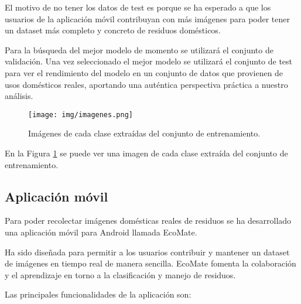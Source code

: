 \documentclass[10pt,a4paper,twocolumn,twoside]{article}
\begin{document}
El motivo de no tener los datos de test es porque se ha esperado a que los usuarios de la aplicación móvil
contribuyan con más imágenes para poder tener un dataset más completo y concreto de residuos domésticos.

Para la búsqueda del mejor modelo de momento se utilizará el conjunto de validación. Una vez seleccionado el
mejor modelo se utilizará el conjunto de test para ver el rendimiento del modelo en un conjunto de datos que
provienen de usos domésticos reales, aportando una auténtica perspectiva práctica a nuestro análisis.

\begin{figure}[h]
  \centering
  \texttt{[image: img/imagenes.png]}
  \caption{Imágenes de cada clase extraídas del conjunto de entrenamiento.}
  \label{fig:imagenes_clases}
\end{figure}

En la Figura \ref{fig:imagenes_clases} se puede ver una imagen de cada clase extraída del conjunto de entrenamiento.

\subsection{Aplicación móvil}

Para poder recolectar imágenes domésticas reales de residuos se ha desarrollado una aplicación móvil para Android llamada EcoMate.

Ha sido diseñada para permitir a los usuarios contribuir y mantener un dataset de imágenes en tiempo real de manera sencilla.
EcoMate fomenta la colaboración y el aprendizaje en torno a la clasificación y manejo de residuos.

Las principales funcionalidades de la aplicación son:
\end{document}
